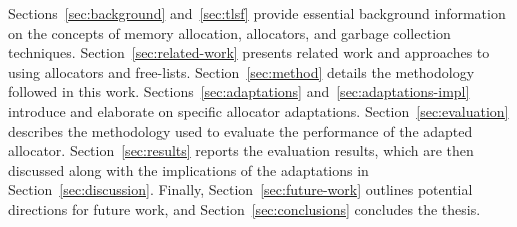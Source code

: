 
Sections~\ref{sec:background} and~\ref{sec:tlsf} provide essential background information on the concepts of memory allocation, allocators, and garbage collection techniques. Section~\ref{sec:related-work} presents related work and approaches to using allocators and free-lists. Section~\ref{sec:method} details the methodology followed in this work. Sections~\ref{sec:adaptations} and~\ref{sec:adaptations-impl} introduce and elaborate on specific allocator adaptations. Section~\ref{sec:evaluation} describes the methodology used to evaluate the performance of the adapted allocator. Section~\ref{sec:results} reports the evaluation results, which are then discussed along with the implications of the adaptations in Section~\ref{sec:discussion}. Finally, Section~\ref{sec:future-work} outlines potential directions for future work, and Section~\ref{sec:conclusions} concludes the thesis.

